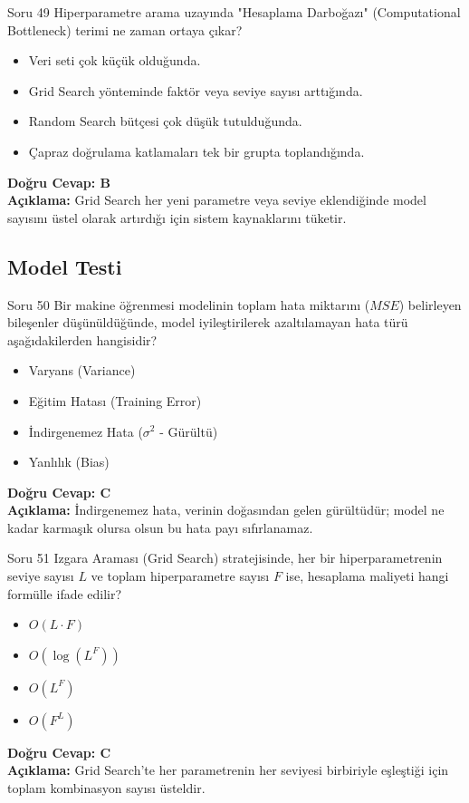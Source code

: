 \documentclass[12pt,a4paper]{article}
\begin{document}
\begin{testcard}{Soru 49}
    Hiperparametre arama uzayında "Hesaplama Darboğazı" (Computational Bottleneck) terimi ne zaman ortaya çıkar?
    \begin{itemize}
        \item[A)] Veri seti çok küçük olduğunda.
        \item[B)] Grid Search yönteminde faktör veya seviye sayısı arttığında.
        \item[C)] Random Search bütçesi çok düşük tutulduğunda.
        \item[D)] Çapraz doğrulama katlamaları tek bir grupta toplandığında.
    \end{itemize}
    \tcblower
    \textbf{Doğru Cevap: B} \\
    \textbf{Açıklama:} Grid Search her yeni parametre veya seviye eklendiğinde model sayısını üstel olarak artırdığı için sistem kaynaklarını tüketir.
\end{testcard}

\newpage
\subsection{Model Testi}

\begin{testcard}{Soru 50}
    Bir makine öğrenmesi modelinin toplam hata miktarını ($MSE$) belirleyen bileşenler düşünüldüğünde, model iyileştirilerek azaltılamayan hata türü aşağıdakilerden hangisidir?
    \begin{itemize}
        \item[A)] Varyans (Variance)
        \item[B)] Eğitim Hatası (Training Error)
        \item[C)] İndirgenemez Hata ($\sigma^2$ - Gürültü)
        \item[D)] Yanlılık (Bias)
    \end{itemize}
    \tcblower
    \textbf{Doğru Cevap: C} \\
    \textbf{Açıklama:} İndirgenemez hata, verinin doğasından gelen gürültüdür; model ne kadar karmaşık olursa olsun bu hata payı sıfırlanamaz.
\end{testcard}

\begin{testcard}{Soru 51}
    Izgara Araması (Grid Search) stratejisinde, her bir hiperparametrenin seviye sayısı $L$ ve toplam hiperparametre sayısı $F$ ise, hesaplama maliyeti hangi formülle ifade edilir?
    \begin{itemize}
        \item[A)] $O(L \cdot F)$
        \item[B)] $O(\log(L^F))$
        \item[C)] $O(L^F)$
        \item[D)] $O(F^L)$
    \end{itemize}
    \tcblower
    \textbf{Doğru Cevap: C} \\
    \textbf{Açıklama:} Grid Search'te her parametrenin her seviyesi birbiriyle eşleştiği için toplam kombinasyon sayısı üsteldir.
\end{testcard}
\end{document}
